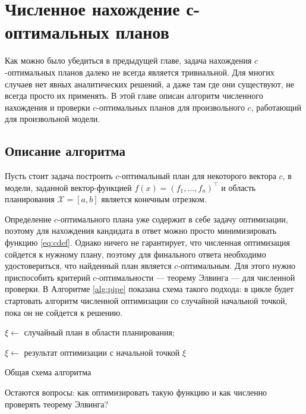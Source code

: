 \documentclass[specialist,
               substylefile = spbu.rtx,
               subf,href,colorlinks=true, 12pt]{disser}
\theoremstyle{definition}
\begin{document}
	
\chapter{Численное нахождение с-оптимальных планов}
	Как можно было убедиться в предыдущей главе, задача нахождения $c$-оптимальных планов далеко не всегда является тривиальной. Для многих случаев нет явных аналитических решений, а даже там где они существуют, не всегда просто их применять. В этой главе описан алгоритм численного нахождения и проверки $c$-оптимальных планов для произвольного $c$, работающий для произвольной модели.
	\section{Описание алгоритма}
	Пусть стоит задача построить $c$-оптимальный план для некоторого вектора $c$, в модели, заданной вектор-функцией $f(x) = (f_1, \ldots, f_n)^\top$ и область планирования $\mathcal{X} = [a, b]$ является конечным отрезком.
	
	Определение $c$-оптимального плана уже содержит в себе задачу оптимизации, поэтому для нахождения кандидата в ответ можно просто минимизировать функцию \eqref{eq:cdef}. Однако ничего не гарантирует, что численная оптимизация сойдется к нужному плану, поэтому для финального ответа необходимо удостовериться, что  найденный план является $c$-оптимальным. Для этого нужно приспособить критерий $c$-оптимальности --- теорему Элвинга --- для численной проверки. В Алгоритме \ref{alg:pipe} показана схема такого подхода: в цикле будет стартовать алгоритм численной оптимизации со случайной начальной точкой, пока он не сойдется к решению.
	\begin{algorithm}
		\SetAlgoLined 
		\KwResult{$\xi$} 
		 {
			$\xi \leftarrow$ случайный план в области планирования;
			
			$\xi \leftarrow$ результат оптимизации с начальной точкой $\xi$
		}
		\caption{Общая схема алгоритма}
		\label{alg:pipe}
	\end{algorithm}

	
	
	Остаются вопросы: как оптимизировать такую функцию и как численно проверять теорему Элвинга?
\end{document}
